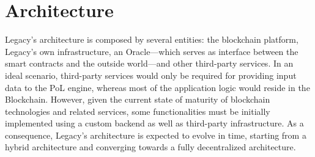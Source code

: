 \chapter{Architecture} %
\label{cha:architecture}

Legacy’s architecture is composed by several entities: the blockchain platform, Legacy’s own infrastructure, an Oracle---which serves as interface between the smart contracts and the outside world---and other third-party services. In an ideal scenario, third-party services would only be required for providing input data to the PoL engine, whereas most of the application logic would reside in the Blockchain. However, given the current state of maturity of blockchain technologies and related services, some functionalities must be initially implemented using a custom backend as well as third-party infrastructure. As a consequence, Legacy’s architecture is expected to evolve in time, starting from a hybrid architecture and converging towards a fully decentralized architecture.


